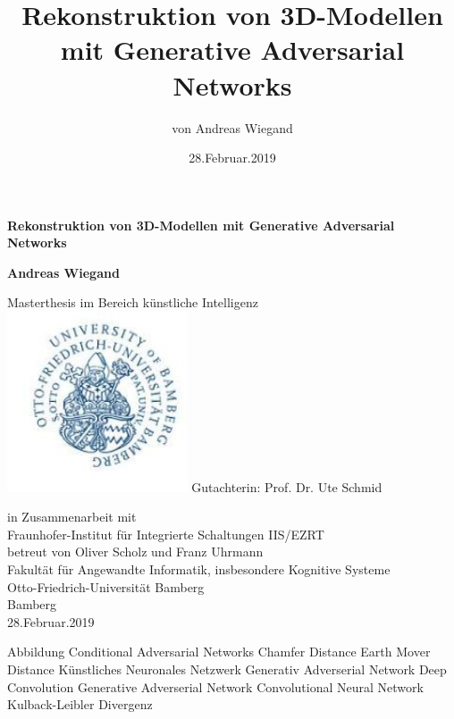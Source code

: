 \documentclass{llncs}
\begin{document}
\begin{titlepage}
	\begin{center}
		\vspace{3cm}
		
		\textbf{\huge Rekonstruktion von 3D-Modellen mit Generative Adversarial Networks}

				
		\vspace{1.5cm}
		
		\textbf{Andreas Wiegand}
		
		
		
		Masterthesis im Bereich künstliche Intelligenz \\
		\vspace{1.5cm}
		\includegraphics[width=0.4\textwidth]{bamberg_logo.png}
		\vspace{1.5cm}
		Gutachterin: Prof. Dr. Ute Schmid

		\vspace{1.5cm}
		in Zusammenarbeit mit\\
		Fraunhofer-Institut für Integrierte Schaltungen IIS/EZRT\\
		betreut von Oliver Scholz und Franz Uhrmann\\
		\vspace{0.8cm}
		Fakultät für Angewandte Informatik, insbesondere Kognitive Systeme\\
		Otto-Friedrich-Universität Bamberg\\
		Bamberg\\
		28.Februar.2019
		
	\end{center}
\end{titlepage}
\tableofcontents
\newpage
\begin{acronym}[Bash]
	 Abbildung
	Conditional Adversarial Networks
	 Chamfer Distance
	 Earth Mover Distance
	 Künstliches Neuronales Netzwerk
	 Generativ Adverserial Network
	Deep Convolution Generative Adverserial Network
	 Convolutional Neural Network
	 Kulback-Leibler Divergenz
\end{acronym}
\title{Rekonstruktion von 3D-Modellen mit Generative Adversarial Networks}
\author{von Andreas Wiegand}
\date{28.Februar.2019}
\maketitle
\end{document}
